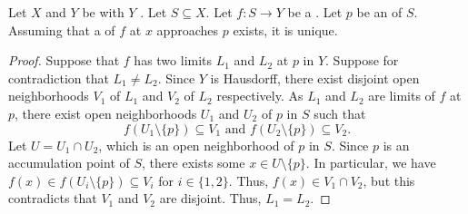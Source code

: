 \begin{lemma}  \label{lemma:limits_of_functions_at_accumulation_points_mapping_to_hausdorff_spaces_are_unique_if_they_exist}
    Let $X$ and $Y$ be  with $Y$ . Let $S \subseteq X$. Let $f: S \to Y$ be a . Let $p$ be an  of $S$. Assuming that a  of $f$ at $x$ approaches $p$ exists, it is unique.
\end{lemma}
\begin{proof}
    Suppose that $f$ has two limits $L_1$ and $L_2$ at $p$ in $Y$. Suppose for contradiction that $L_1 \neq L_2$. Since $Y$ is Hausdorff, there exist disjoint open neighborhoods $V_1$ of $L_1$ and $V_2$ of $L_2$ respectively. As $L_1$ and $L_2$ are limits of $f$ at $p$, there exist open neighborhoods $U_1$ and $U_2$ of $p$ in $S$ such that
    $$f(U_1 \setminus \{p\}) \subseteq V_1 \text{ and } f(U_2 \setminus \{p\}) \subseteq V_2.$$
    Let $U = U_1 \cap U_2$, which is an open neighborhood of $p$ in $S$. Since $p$ is an accumulation point of $S$, there exists some $x \in U \setminus \{p\}$. In particular, we have $f(x) \in f(U_i \setminus \{p\}) \subseteq V_i$ for $i \in \{1,2\}$. Thus, $f(x) \in V_1 \cap V_2$, but this contradicts that $V_1$ and $V_2$ are disjoint. Thus, $L_1 = L_2$.
\end{proof}